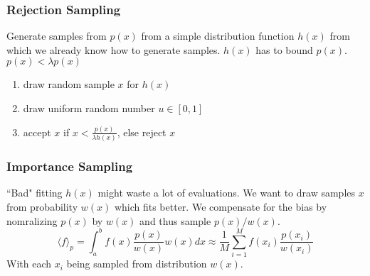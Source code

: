     \subsubsection{Rejection Sampling}
        Generate samples from $p(x)$ from a simple distribution function $h(x)$ from which we already know how to generate samples. $h(x)$ has to bound $p(x)$. $p(x) < \lambda p(x)$
        \begin{enumerate}
            \item draw random sample $x$ for $h(x)$
            \item draw uniform random number $u\in[0,1]$
            \item accept $x$ if $x < \frac{p(x)}{\lambda h(x)}$, else reject $x$
        \end{enumerate}
    
    \subsubsection{Importance Sampling}
        ``Bad" fitting $h(x)$ might waste a lot of evaluations. We want to draw samples $x$ from probability $w(x)$ which fits better. We compensate for the bias by nomralizing $p(x)$ by $w(x)$ and thus sample $p(x)/w(x)$.
        \begin{equation*}
            \langle f \rangle_p = \int_a^b f(x)\frac{p(x)}{w(x)}w(x)dx \approx \frac{1}{M}\sum_{i=1}^M f(x_i)\frac{p(x_i)}{w(x_i)}
        \end{equation*}
        With each $x_i$ being sampled from distribution $w(x)$.
    
